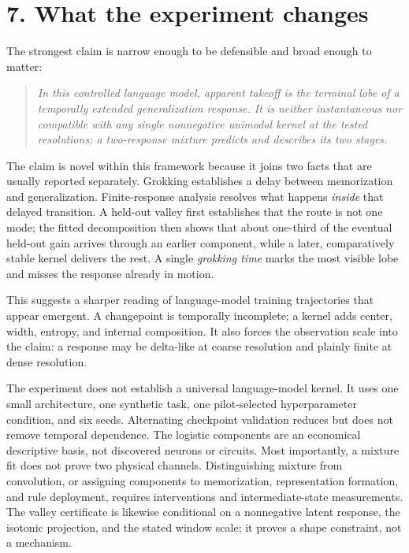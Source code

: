 \documentclass[10pt]{article}
\theoremstyle{compact}
\begin{document}
\section*{7. What the experiment changes}

The strongest claim is narrow enough to be defensible and broad enough to
matter:

\begin{quote}
\emph{In this controlled language model, apparent takeoff is the terminal lobe
of a temporally extended generalization response. It is neither instantaneous
nor compatible with any single nonnegative unimodal kernel at the tested
resolutions; a two-response mixture predicts and describes its two stages.}
\end{quote}

The claim is novel within this framework because it joins two facts that are
usually reported separately. Grokking establishes a delay between memorization
and generalization. Finite-response analysis resolves what happens \emph{inside}
that delayed transition. A held-out valley first establishes that the route is
not one mode; the fitted decomposition then shows that about one-third of the
eventual held-out gain arrives through an earlier component, while a later,
comparatively stable kernel delivers the rest. A single \emph{grokking time}
marks the most visible lobe and misses the response already in motion.

This suggests a sharper reading of language-model training trajectories that
appear emergent. A changepoint is temporally incomplete; a kernel adds center,
width, entropy, and internal composition. It also forces the observation scale
into the claim: a response may be delta-like at coarse resolution and plainly
finite at dense resolution.

The experiment does not establish a universal language-model kernel. It uses one small
architecture, one synthetic task, one pilot-selected hyperparameter condition,
and six seeds. Alternating checkpoint validation reduces but does not remove
temporal dependence. The logistic components are an economical descriptive
basis, not discovered neurons or circuits. Most importantly, a mixture fit does
not prove two physical channels. Distinguishing mixture from convolution, or
assigning components to memorization, representation formation, and rule
deployment, requires interventions and intermediate-state measurements.
The valley certificate is likewise conditional on a nonnegative latent
response, the isotonic projection, and the stated window scale; it proves a
shape constraint, not a mechanism.
\end{document}
